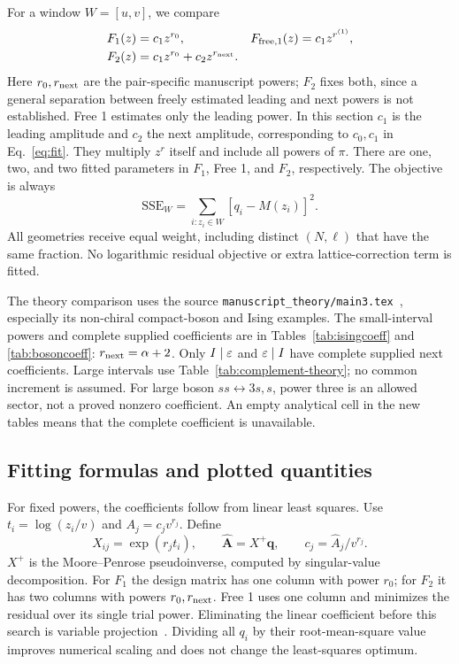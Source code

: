 For a window $W=[u,v]$, we compare
\begin{align}
 F_1(z)&=c_1z^{r_0},&
 F_{\mathrm{free},1}(z)&=c_1z^{r^{(1)}},\nonumber\\
 F_2(z)&=c_1z^{r_0}+c_2z^{r_{\rm next}}.
 \label{eq:window-models}
\end{align}
Here $r_0,r_{\rm next}$ are the pair-specific manuscript powers;
$F_2$ fixes both, since a general separation between freely estimated
leading and next powers is not established. Free 1 estimates only the
leading power. In this section $c_1$ is the leading amplitude and $c_2$ the
next amplitude, corresponding to $c_0,c_1$ in
Eq.~\eqref{eq:fit}. They multiply $z^r$ itself and include all powers
of $\pi$. There are one, two, and two fitted parameters in
$F_1$, Free 1, and $F_2$, respectively. The objective is always
\begin{equation}
 \mathrm{SSE}_W=\sum_{i:z_i\in W}[q_i-M(z_i)]^2.
 \label{eq:window-objective}
\end{equation}
All geometries receive equal weight, including distinct $(N,\ell)$
that have the same fraction. No logarithmic residual objective or
extra lattice-correction term is fitted.

The theory comparison uses the source
\texttt{manuscript\_theory/main3.tex}~\cite{theoryLarge}, especially its
non-chiral compact-boson and Ising examples. The small-interval powers
and complete supplied coefficients are in
Tables~\ref{tab:isingcoeff} and \ref{tab:bosoncoeff}:
$r_{\rm next}=\alpha+2$. Only $I\mid\varepsilon$ and $\varepsilon\mid I$ have
complete supplied next coefficients. Large intervals use
Table~\ref{tab:complement-theory}; no common increment is assumed.
For large boson $ss\leftrightarrow3s,s$, power three is an allowed
sector, not a proved nonzero coefficient. An empty analytical cell
in the new tables means that the complete coefficient is unavailable.

\subsection{Fitting formulas and plotted quantities}
For fixed powers, the coefficients follow from linear least squares.
Use $t_i=\log(z_i/v)$ and $A_j=c_jv^{r_j}$. Define
\begin{equation}
 X_{ij}=\exp(r_jt_i),\qquad
 \widehat{\boldsymbol A}=X^+\boldsymbol q,\qquad
 c_j=\widehat A_j/v^{r_j}.
 \label{eq:window-profile}
\end{equation}
$X^+$ is the Moore--Penrose pseudoinverse, computed by singular-value
decomposition. For $F_1$ the design matrix has one column with power
$r_0$; for $F_2$ it has two columns with powers $r_0,r_{\rm next}$.
Free 1 uses one column and minimizes the residual over its single
trial power. Eliminating the linear coefficient before this search
is variable projection~\cite{GolubPereyra}. Dividing all $q_i$ by their
root-mean-square value improves numerical scaling and does not change
the least-squares optimum.

